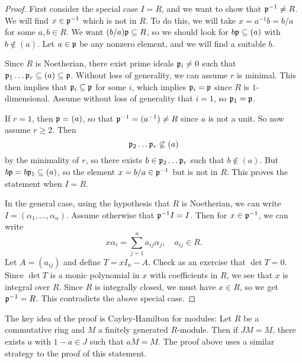\begin{proof}
  First consider the special case $I = R$, and we
  want to show that $\mathfrak{p}^{-1} \ne R$. We will find
  $x \in \mathfrak{p}^{-1}$ which is not in $R$. To do this,
  we will take $x = a^{-1} b = b / a$ for some $a, b \in R$.
  We want $(b / a) \mathfrak{p} \subseteq R$, so we should look
  for $b \mathfrak{p} \subseteq (a)$ with $b \notin (a)$.
  Let $a \in \mathfrak{p}$ be any nonzero element, and
  we will find a suitable $b$.

  Since $R$ is Noetherian, there exist prime ideals
  $\mathfrak{p}_i \ne 0$ such that
  $\mathfrak{p}_1 \dots \mathfrak{p}_r \subseteq (a) \subseteq \mathfrak{p}$.
  Without loss of generality, we can assume $r$ is minimal.
  This then implies that $\mathfrak{p}_i \subseteq \mathfrak{p}$ for
  some $i$, which implies $\mathfrak{p}_i = \mathfrak{p}$ since
  $R$ is $1$-dimensional. Assume without loss of
  generality that $i = 1$, so $\mathfrak{p}_1 = \mathfrak{p}$.

  If $r = 1$, then $\mathfrak{p} = (a)$, so that
  $\mathfrak{p}^{-1} = (a^{-1}) \ne R$ since $a$ is not a unit.
  So now assume $r \ge 2$. Then
  \[
    \mathfrak{p}_2 \dots \mathfrak{p}_r \not\subseteq (a)
  \]
  by the minimality of $r$, so there exists
  $b \in \mathfrak{p}_2 \dots \mathfrak{p}_r$ such that $b \notin (a)$.
  But $b \mathfrak{p} = b \mathfrak{p}_1 \subseteq (a)$, so the element
  $x = b / a \in \mathfrak{p}^{-1}$
  but is not in $R$. This proves the statement
  when $I = R$.

  In the general case, using the hypothesis that $R$
  is Noetherian, we can write $I = (\alpha_1, \dots, \alpha_n)$.
  Assume otherwise that $\mathfrak{p}^{-1} I = I$.
  Then for $x \in \mathfrak{p}^{-1}$, we can write
  \[
    x \alpha_i = \sum_{j = 1}^n a_{ij} \alpha_j,
    \quad a_{ij} \in R.
  \]
  Let $A = (a_{ij})$ and define
  $T = x I_n - A$. Check as an exercise that
  $\det T = 0$. Since $\det T$ is a monic polynomial
  in $x$ with coefficients in $R$, we see that
  $x$ is integral over $R$. Since $R$ is integrally
  closed, we must have $x \in R$, so we get
  $\mathfrak{p}^{-1} = R$. This contradicts the above special
  case.
\end{proof}

\begin{remark}
  The key idea of the proof is Cayley-Hamilton for
  modules: Let $R$ be a commutative ring and $M$ a
  finitely generated $R$-module. Then if
  $JM = M$, there exists $a$ with $1 - a \in J$
  such that $aM = M$. The proof above uses a similar
  strategy to the proof of this statement.
\end{remark}
